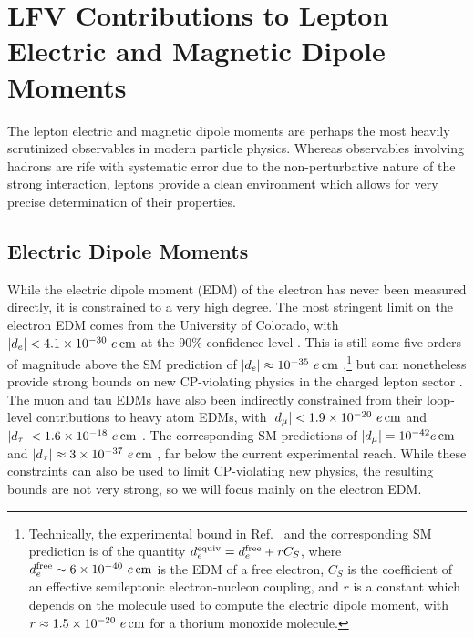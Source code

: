 {\section{LFV Contributions to Lepton Electric and Magnetic Dipole Moments}\label{sec:edm_mdm}

The lepton electric and magnetic dipole moments are perhaps the most heavily scrutinized observables in modern particle physics. Whereas observables involving hadrons are rife with systematic error due to the non-perturbative nature of the strong interaction, leptons provide a clean environment which allows for very precise determination of their properties. 

\subsection{Electric Dipole Moments}\label{sec:edm}

While the electric dipole moment (EDM) of the electron has never been measured directly, it is constrained to a very high degree. The most stringent limit on the electron EDM comes from the University of Colorado, with $|d_e| < 4.1\times 10^{-30}~e\,{\rm cm}$ at the 90\% confidence level \cite{Roussy:2022cmp}. This is still some five orders of magnitude above the SM prediction of $|d_e|\approx 10^{-35}~e\,{\rm cm}$ \cite{Ema:2022yra},\footnote{Technically, the experimental bound in Ref.~\cite{Roussy:2022cmp} and the corresponding SM prediction \cite{Ema:2022yra} is of the quantity $d_e^{\rm equiv} = d_e^{\rm free} + r C_{S}$, where $d_e^{\rm free}\sim 6\times 10^{-40}~e\,{\rm cm}$ is the EDM of a free electron\cite{Yamaguchi:2020eub}, $C_S$ is the coefficient of an effective semileptonic electron-nucleon coupling, and $r$ is a constant which depends on the molecule used to compute the electric dipole moment, with $r \approx 1.5\times 10^{-20}~e\,{\rm cm}$ for a thorium monoxide molecule.} but can nonetheless provide strong bounds on new CP-violating physics in the charged lepton sector \cite{Cesarotti:2018huy,Pospelov:2005pr}. The muon and tau EDMs have also been indirectly constrained from their loop-level contributions to heavy atom EDMs, with $|d_\mu| < 1.9\times 10^{-20}~e\,{\rm cm}$ and $|d_\tau| < 1.6\times 10^{-18}~e\,{\rm cm}$ \cite{Ema:2021jds}. The corresponding SM predictions of $|d_\mu| = 10^{-42}e\,{\rm cm}$ \cite{Ema:2021jds} and $|d_\tau| \approx 3\times 10^{-37}~e\,{\rm cm}$ \cite{Mahanta:1996er}, far below the current experimental reach. While these constraints can also be used to limit CP-violating new physics, the resulting bounds are not very strong, so we will focus mainly on the electron EDM.

}
